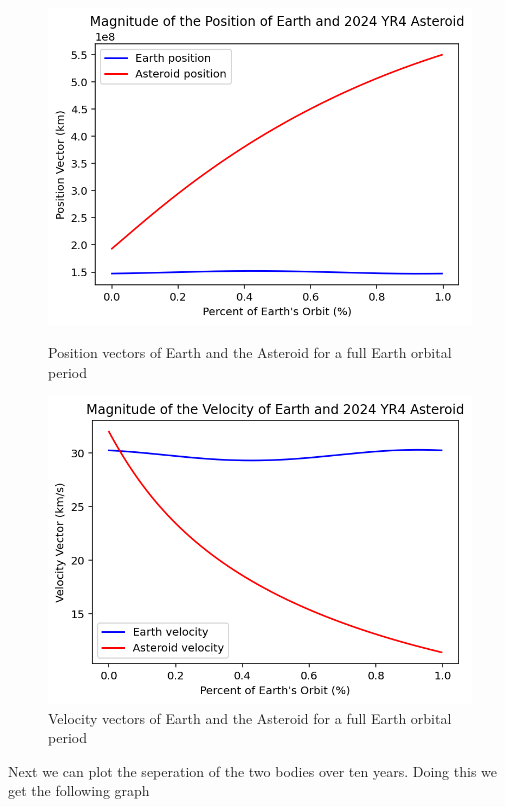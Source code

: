 \documentclass[12pt,twocolumn]{article}  %
\begin{document}
\begin{figure}[H]
    \centering
    \begin{minipage}{0.48\textwidth}
        \centering
        \includegraphics[width=\textwidth]{Images/114-pos.png}
        \caption{Position vectors of Earth and the Asteroid for a full Earth orbital period}
    \end{minipage}
    \hfill
    \begin{minipage}{0.48\textwidth}
        \centering
        \includegraphics[width=\textwidth]{Images/114-vel.png}
        \caption{Velocity vectors of Earth and the Asteroid for a full Earth orbital period}
    \end{minipage}
\end{figure}
\vspace{-0.2cm}
\noindent Next we can plot the seperation of the two bodies over ten years. Doing this we get the following graph
\end{document}
